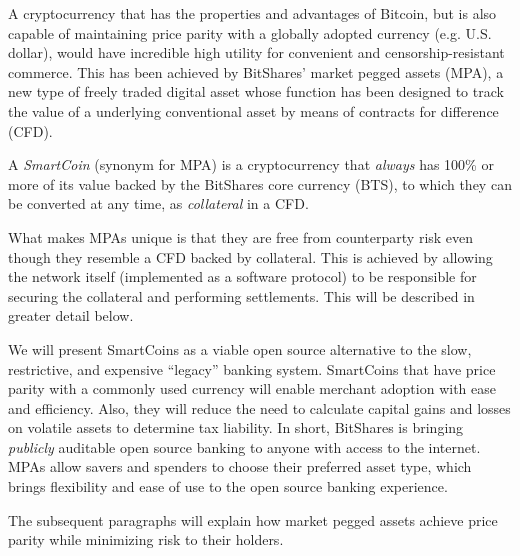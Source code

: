 \label{sec:mpa}

A cryptocurrency that has the properties and advantages of Bitcoin, but is also
capable of maintaining price parity with a globally adopted currency (e.g.
U.S. dollar), would have incredible high utility for convenient and
censorship-resistant commerce. This has been achieved by BitShares' market
pegged assets (MPA), a new type of freely traded digital asset whose function
has been designed to track the value of a underlying conventional asset by
means of contracts for difference (CFD). 

A \emph{SmartCoin} (synonym for MPA) is a cryptocurrency that \emph{always} has
100\% or more of its value backed by the BitShares core currency (BTS), to
which they can be converted at any time, as \emph{collateral} in a CFD.

What makes MPAs unique is that they are free from counterparty risk even though
they resemble a CFD backed by collateral. This is achieved by allowing the
network itself (implemented as a software protocol) to be responsible for
securing the collateral and performing settlements. This will be described in
greater detail below.


We will present SmartCoins as a viable open source alternative to the slow,
restrictive, and expensive ``legacy'' banking system.  SmartCoins that have
price parity with a commonly used currency will enable merchant adoption with
ease and efficiency. Also, they will reduce the need to calculate capital gains
and losses on volatile assets to determine tax liability. In short, BitShares
is bringing \emph{publicly} auditable open source banking to anyone with access
to the internet. MPAs allow savers and spenders to choose their preferred asset
type, which brings flexibility and ease of use to the open source banking
experience.

The subsequent paragraphs will explain how market pegged assets achieve price
parity while minimizing risk to their holders.
